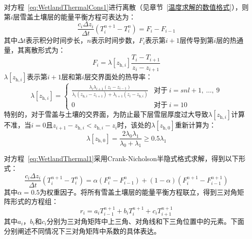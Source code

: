 对方程~\eqref{eq:WetlandThermalCons1}进行离散（见章节~\ref{温度求解的数值格式}），则第$i$层雪盖土壤层的能量平衡方程可表达为：
\begin{equation}\label{eq:WetlandThermal1}
  \frac{c_i \Delta z_i}{\Delta t} \left(T^{n+1}_i - T^n_i\right) = F_i - F_{i-1}
\end{equation}
其中$\Delta t$表示积分时间步长，$n$表示时间步数，$F_i$表示第$i+1$层传导到第$i$层的热通量，其离散形式为：
\begin{equation}
  F_i = \lambda \left[z_{\mathrm{h},i}\right] \frac{T_i-T_{i+1}}{z_i-z_{i+1}}
\end{equation}
$\lambda\left[z_{\mathrm{h},i}\right]$表示第$i+1$层和第$i$层交界面处的热导率：
\begin{equation}
  \lambda \left[z_{\mathrm{h},i}\right] = \begin{cases}
    \frac{\lambda_i\lambda_{i+1}\left(z_i-z_{i-1}\right)}{\lambda_i\left(z_{\mathrm{h},i}-z_{i+1}\right)+\lambda_{i+1}\left(z_i-z_{\mathrm{h},i}\right)}  &\text{对于}\ i=snl+1,\ \ldots,\ 9 \\
    0 &\text{对于}\ i=10
  \end{cases}
\end{equation}
特别的，对于雪盖与土壤的交界面，为防止最下层雪层厚度过大导致$\lambda\left[z_{\mathrm{h},i}\right]$计算不准，当$i=0$且$z_{i+1}-z_{\mathrm{h},i}<z_{\mathrm{h},i}-z_i$时，该处的$\lambda\left[z_{\mathrm{h,0}}\right]$重新计算为：
\begin{equation}
  \lambda\left[z_{\mathrm{h,0}}\right]=\frac{2\lambda_0\lambda_1}{\lambda_0+\lambda_1} \geqslant 0.5\lambda_1
\end{equation}

对方程~\eqref{eq:WetlandThermal1}采用Crank-Nicholson半隐式格式求解，得到以下形式：
\begin{equation}
  \frac{c_i\Delta z_i}{\Delta t}\left(T^{n+1}_i - T^n_i\right)=\alpha \left(F^n_i - F^n_{i-1}\right) + \left(1-\alpha \right) \left(F^{n+1}_i - F^{n+1}_{i-1}\right)
\end{equation}
其中$\alpha = 0.5$为权重因子。将所有雪盖土壤层的能量平衡方程联立，得到三对角矩阵形式的方程组：
\begin{equation}
  r_i = a_i T^{n+1}_{i-1} + b_i T^{n+1}_i + c_i T^{n+1}_{i+1}
\end{equation}
其中$a_i$，$b_i$和$c_i$分别为三对角矩阵中上三角、对角线和下三角位置中的元素。下面分别阐述不同情况下三对角矩阵中系数的具体表达。

